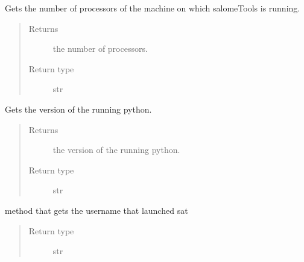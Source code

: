 \documentclass[a4paper,10pt,english]{sphinxmanual}
\begin{document}

\begin{fulllineitems}
\label{commands/apidoc/src:src.architecture.get_nb_proc}
Gets the number of processors of the machine 
on which salomeTools is running.
\begin{quote}\begin{description}
\item[{Returns}] \leavevmode
the number of processors.

\item[{Return type}] \leavevmode
str

\end{description}\end{quote}

\end{fulllineitems}


\begin{fulllineitems}
\label{commands/apidoc/src:src.architecture.get_python_version}
Gets the version of the running python.
\begin{quote}\begin{description}
\item[{Returns}] \leavevmode
the version of the running python.

\item[{Return type}] \leavevmode
str

\end{description}\end{quote}

\end{fulllineitems}


\begin{fulllineitems}
\label{commands/apidoc/src:src.architecture.get_user}
method that gets the username that launched sat
\begin{quote}\begin{description}
\item[{Return type}] \leavevmode
str

\end{description}\end{quote}

\end{fulllineitems}
\end{document}
